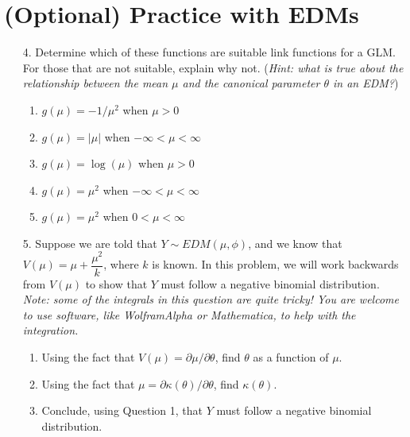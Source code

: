 \documentclass[11pt]{article}
\begin{document}
\section*{(Optional) Practice with EDMs}

\begin{enumerate}
\item[4.] Determine which of these functions are suitable link functions for a GLM. For those that are not suitable, explain why not. (\textit{Hint: what is true about the relationship between the mean $\mu$ and the canonical parameter $\theta$ in an EDM?})

\begin{enumerate}
\item $g(\mu) = -1/\mu^2$ when $\mu > 0$
\item $g(\mu) = |\mu|$ when $-\infty < \mu < \infty$
\item $g(\mu) = \log(\mu)$ when $\mu > 0$
\item $g(\mu) = \mu^2$ when $-\infty < \mu < \infty$
\item $g(\mu) = \mu^2$ when $0 < \mu < \infty$
\end{enumerate}

\item[5.] Suppose we are told that $Y \sim EDM(\mu, \phi)$, and we know that $V(\mu) = \mu + \dfrac{\mu^2}{k}$, where $k$ is known. In this problem, we will work backwards from $V(\mu)$ to show that $Y$ must follow a negative binomial distribution. \textit{Note: some of the integrals in this question are quite tricky! You are welcome to use software, like WolframAlpha or Mathematica, to help with the integration.}

\begin{enumerate}
\item Using the fact that $V(\mu) = \partial \mu / \partial \theta$, find $\theta$ as a function of $\mu$.

\item Using the fact that $\mu = \partial \kappa(\theta) / \partial \theta$, find $\kappa(\theta)$.

\item Conclude, using Question 1, that $Y$ must follow a negative binomial distribution.
\end{enumerate}
\end{enumerate}
\end{document}
